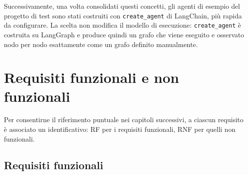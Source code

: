 Successivamente, una volta consolidati questi concetti, gli agenti di esempio del progetto di test sono stati costruiti con \texttt{create\_agent} di LangChain, più rapida da configurare. La scelta non modifica il modello di esecuzione: \texttt{create\_agent} è costruita su LangGraph \cite{langchainv1} e produce quindi un grafo che viene eseguito e osservato nodo per nodo esattamente come un grafo definito manualmente.

\section{Requisiti funzionali e non funzionali}
\label{sec:requisiti}

Per consentirne il riferimento puntuale nei capitoli successivi, a ciascun requisito è associato un identificativo: RF per i requisiti funzionali, RNF per quelli non funzionali.

\subsection{Requisiti funzionali}

